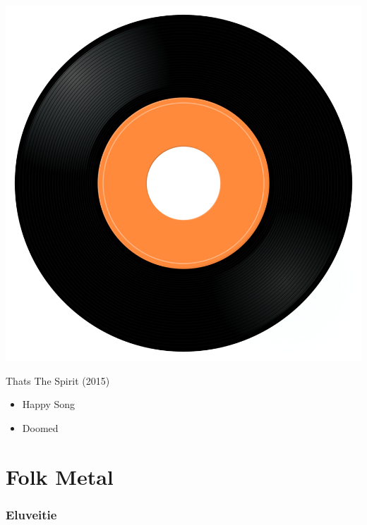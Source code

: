 \begin{minipage}[t]{0.25\textwidth}
\captionsetup{type=figure}
\includegraphics[width=\textwidth]{Images/cover.png}
\caption*{Thats The Spirit (2015)}
\end{minipage}
\begin{minipage}[t]{0.25\textwidth}\vspace{0pt}
\begin{itemize}[nosep,leftmargin=1em,labelwidth=*,align=left]
	\setlength{\itemsep}{0pt}
	\item Happy Song
	\item Doomed
\end{itemize}
\end{minipage}


\section{Folk Metal}

\subsubsection{Eluveitie}

